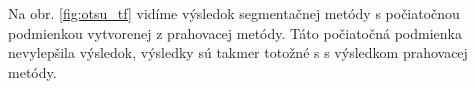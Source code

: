 \documentclass[a4paper,11pt,oneside]{article}%
\begin{document}
Na obr. \ref{fig:otsu_tf} vidíme výsledok segmentačnej metódy s počiatočnou podmienkou vytvorenej z prahovacej metódy. Táto počiatočná podmienka nevylepšila výsledok, výsledky sú takmer totožné s s výsledkom prahovacej metódy. 

\begin{figure}[H]  
    \hspace{5px}

\end{figure}
\end{document}
